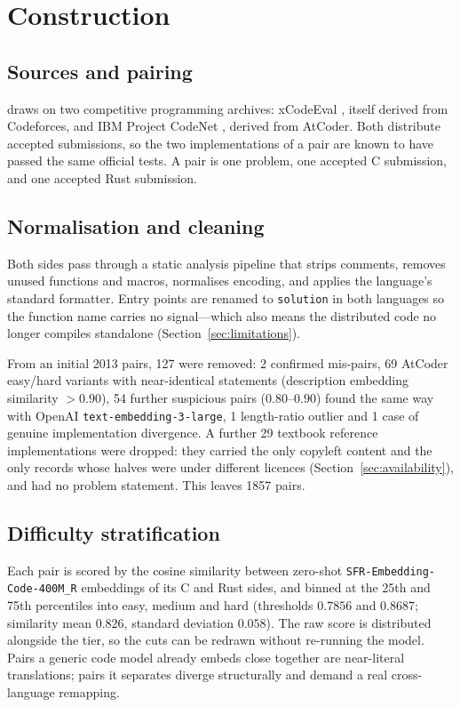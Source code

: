 \section{Construction}
\label{sec:construction}

\subsection{Sources and pairing}

\dsname{} draws on two competitive programming archives: xCodeEval
\cite{khan2024xcodeeval}, itself derived from Codeforces, and IBM Project
CodeNet \cite{puri2021codenet}, derived from AtCoder. Both distribute accepted
submissions, so the two implementations of a pair are known to have passed the
same official tests. A pair is one problem, one accepted C submission, and one
accepted Rust submission.

\subsection{Normalisation and cleaning}

Both sides pass through a static analysis pipeline that strips comments,
removes unused functions and macros, normalises encoding, and applies the
language's standard formatter. Entry points are renamed to \texttt{solution} in
both languages so the function name carries no signal---which also means the
distributed code no longer compiles standalone
(Section~\ref{sec:limitations}).


From an initial 2013 pairs, 127 were removed: 2 confirmed mis-pairs, 69 AtCoder
easy/hard variants with near-identical statements (description embedding
similarity $>0.90$), 54 further suspicious pairs ($0.80$--$0.90$) found the same
way with OpenAI \texttt{text-embedding-3-large}, 1 length-ratio outlier and 1
case of genuine implementation divergence. A further 29 textbook reference
implementations were dropped: they carried the only copyleft content and the
only records whose halves were under different licences
(Section~\ref{sec:availability}), and had no problem statement. This leaves
1857 pairs.

\subsection{Difficulty stratification}

Each pair is scored by the cosine similarity between zero-shot
\texttt{SFR-Embedding-Code-400M\_R} embeddings of its C and Rust sides, and
binned at the 25th and 75th percentiles into easy, medium and hard
(thresholds $0.7856$ and $0.8687$; similarity mean $0.826$, standard deviation
$0.058$). The raw score is distributed alongside the tier, so the cuts can be
redrawn without re-running the model. Pairs a
generic code model already embeds close together are near-literal translations;
pairs it separates diverge structurally and demand a real cross-language
remapping.

